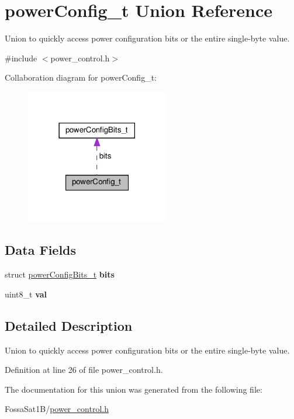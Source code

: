 \hypertarget{unionpower_config__t}{}\section{power\+Config\+\_\+t Union Reference}
\label{unionpower_config__t}


Union to quickly access power configuration bits or the entire single-\/byte value.  




{\ttfamily \#include $<$power\+\_\+control.\+h$>$}



Collaboration diagram for power\+Config\+\_\+t\+:
\nopagebreak
\begin{figure}[H]
\begin{center}
\leavevmode
\includegraphics[width=177pt]{unionpower_config__t__coll__graph}
\end{center}
\end{figure}
\subsection*{Data Fields}
\begin{DoxyCompactItemize}
\item 
\mbox{\label{unionpower_config__t_a4d894bc56a0a7c9fbb405955f799ee46}} 
struct \hyperlink{structpower_config_bits__t}{power\+Config\+Bits\+\_\+t} {\bfseries bits}
\item 
\mbox{\label{unionpower_config__t_a8c7fe6eb17488063a0393bc90231f090}} 
uint8\+\_\+t {\bfseries val}
\end{DoxyCompactItemize}


\subsection{Detailed Description}
Union to quickly access power configuration bits or the entire single-\/byte value. 

Definition at line 26 of file power\+\_\+control.\+h.



The documentation for this union was generated from the following file\+:\begin{DoxyCompactItemize}
\item 
Fossa\+Sat1\+B/\hyperlink{power__control_8h}{power\+\_\+control.\+h}\end{DoxyCompactItemize}
